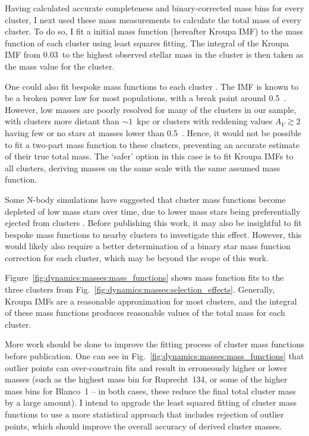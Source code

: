 Having calculated accurate completeness and binary-corrected mass bins for every cluster, I next used these mass measurements to calculate the total mass of every cluster. To do so, I fit a \cite{kroupa_variation_2001} initial mass function (hereafter Kroupa IMF) to the mass function of each cluster using least squares fitting. The integral of the Kroupa IMF from 0.03~\MSun to the highest observed stellar mass in the cluster is then taken as the mass value for the cluster.

One could also fit bespoke mass functions to each cluster \citep[e.g. as in][]{cordoni_photometric_binaries_2023}. The IMF is known to be a broken power law for most populations, with a break point around 0.5~\MSun \citep{kroupa_variation_2001}. However, low masses are poorly resolved for many of the clusters in our sample, with clusters more distant than $\sim1$~kpc or clusters with reddening values $A_V \gtrsim 2$ having few or no stars at masses lower than 0.5~\MSun. Hence, it would not be possible to fit a two-part mass function to these clusters, preventing an accurate estimate of their true total mass. The `safer' option in this case is to fit Kroupa IMFs to all clusters, deriving masses on the same scale with the same assumed mass function.

Some N-body simulations have suggested that cluster mass functions become depleted of low mass stars over time, due to lower mass stars being preferentially ejected from clusters . Before publishing this work, it may also be insightful to fit bespoke mass functions to nearby clusters to investigate this effect. However, this would likely also require a better determination of a binary star mass function correction for each cluster, which may be beyond the scope of this work.

Figure~\ref{fig:dynamics:masses:mass_functions} shows mass function fits to the three clusters from Fig.~\ref{fig:dynamics:masses:selection_effects}. Generally, Kroupa IMFs are a reasonable approximation for most clusters, and the integral of these mass functions produces reasonable values of the total mass for each cluster. 

More work should be done to improve the fitting process of cluster mass functions before publication. One can see in Fig.~\ref{fig:dynamics:masses:mass_functions} that outlier points can over-constrain fits and result in erroneously higher or lower masses (such as the highest mass bin for Ruprecht~134, or some of the higher mass bins for Blanco~1 -- in both cases, these reduce the final total cluster mass by a large amount). I intend to upgrade the least squared fitting of cluster mass functions to use a more statistical approach that includes rejection of outlier points, which should improve the overall accuracy of derived cluster masses.


